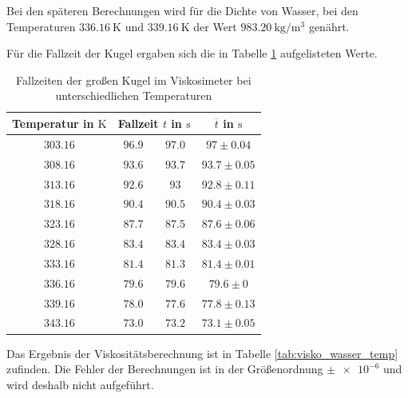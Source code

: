 Bei den späteren Berechnungen wird für die Dichte von Wasser, bei den Temperaturen $\SI{336.16}{\kelvin}$ und $\SI{339.16}{\kelvin}$
der Wert $\SI{983.20}{\kilogram\per\cubic\meter}$ genährt. %

Für die Fallzeit der Kugel ergaben sich die in  %
Tabelle \ref{tab:messwerte_fallzeit_kugel_gross_temo} aufgelisteten Werte.

\begin{table}
\centering
\begin{tabular} {cccc}
  \toprule
  Temperatur in $\si{\kelvin}$ & \multicolumn{2}{c}{Fallzeit $t$ in $\si{\second}$} & $\overline{t}$ in $\si{\second}$ \\
  \midrule
  $\num{303.16}$ & $\num{96.9}$  & $\num{97.0}$ & $\num{97}\pm\num{0.04}$ \\
  $\num{308.16}$ & $\num{93.6}$  & $\num{93.7}$ & $\num{93.7}\pm\num{0.05}$ \\
  $\num{313.16}$ & $\num{92.6}$ & $\num{93}$   & $\num{92.8}\pm\num{0.11}$ \\
  $\num{318.16}$ & $\num{90.4}$ & $\num{90.5}$ &  $\num{90.4}\pm\num{0.03}$ \\
  $\num{323.16}$ & $\num{87.7}$ & $\num{87.5}$ & $\num{87.6}\pm\num{0.06}$ \\
  $\num{328.16}$ & $\num{83.4}$ & $\num{83.4}$ & $\num{83.4}\pm\num{0.03}$ \\
  $\num{333.16}$ & $\num{81.4}$ & $\num{81.3}$ & $\num{81.4}\pm\num{0.01}$ \\
  $\num{336.16}$ & $\num{79.6}$ & $\num{79.6}$ & $\num{79.6}\pm\num{0}$ \\
  $\num{339.16}$ & $\num{78.0}$ &  $\num{77.6}$ & $\num{77.8}\pm\num{0.13}$ \\
  $\num{343.16}$ & $\num{73.0}$ & $\num{73.2}$ & $\num{73.1}\pm\num{0.05}$ \\
\bottomrule
\end{tabular}
\caption{Fallzeiten der großen Kugel im Viskosimeter bei unterschiedlichen Temperaturen} %
\label{tab:messwerte_fallzeit_kugel_gross_temo}
\end{table}

Das Ergebnis der Viskositätsberechnung ist in Tabelle \ref{tab:visko_wasser_temp} zufinden. %
Die Fehler der Berechnungen ist in der Größenordnung $\pm \num{e-6}$ und
wird deshalb nicht aufgeführt.

